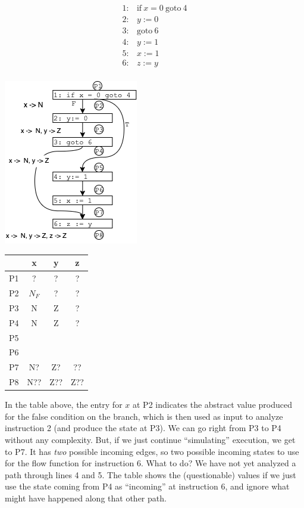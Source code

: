 \documentclass[11pt]{article}
\begin{document}
\begin{center}
\begin{minipage}[t][-9.7em][b]{0.3\textwidth} %
\[
\begin{array}{ll}
1: & \mbox{if}~x=0~\mbox{goto}~4\\
2: & y := 0\\
3: & \mbox{goto}~6\\
4: & y := 1\\
5: & x := 1\\
6: & z := y\\
\end{array}
\]
\end{minipage}
\includegraphics[scale=0.75]{images/df-notes-if1}
\begin{minipage}[t][-9.7em][b]{0.30\textwidth} %
\begin{tabular}{r | c c c}
  & x & y & z \\
\midrule
P1 & ?  & ?  & ? \\
P2 & $N_F$ & ? & ?  \\
P3 & N & Z & ?  \\
P4 & N & Z & ? \\
P5 &   &   &  \\
P6 &   &   &  \\
P7 & N?  & Z?   & ??  \\
P8 & N?? & Z?? & Z?? \\
\end{tabular}
\end{minipage}
\end{center}

In the table above, the entry for $x$ at P2 indicates the abstract value
produced for the false condition on the branch, which is then used as input to
analyze instruction 2 (and produce the state at P3). We can go right from P3 to
P4 without any complexity.
%
But, if we just continue ``simulating'' execution, we get to P7.  It has \emph{two}
possible incoming edges, so two possible incoming states to use for the flow
function for instruction 6.  What to do?
We have not yet analyzed a path through lines 4 and 5.  The table shows the
(questionable) values if we just use the state coming from P4 as ``incoming'' at
instruction 6, and ignore what might have happened along that other path. 
\end{document}
